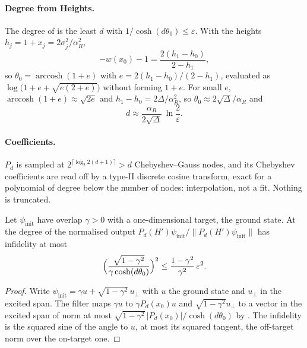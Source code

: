 \paragraph{Degree from Heights.} The degree of  is the least $d$ with $1/\cosh(d\theta_0)\le\varepsilon$. With the heights $h_j=1+x_j=2\sigma_j^2/\alpha_R^2$,
\begin{equation*}
    -w(x_0)-1=\frac{2(h_1-h_0)}{2-h_1},
\end{equation*}
so $\theta_0=\operatorname{arccosh}(1+e)$ with $e=2(h_1-h_0)/(2-h_1)$, evaluated as $\log\bigl(1+e+\sqrt{e(2+e)}\bigr)$ without forming $1+e$. For small $e$, $\operatorname{arccosh}(1+e)\approx\sqrt{2e}$ and $h_1-h_0=2\Delta/\alpha_R^2$, so $\theta_0\approx2\sqrt\Delta/\alpha_R$ and
\begin{equation}
    d\approx\frac{\alpha_R}{2\sqrt\Delta}\,\ln\frac2\varepsilon .
    \label{eq:app-minimax-growth}
\end{equation}

\paragraph{Coefficients.} $P_d$ is sampled at $2^{\lceil\log_2 2(d+1)\rceil}>d$ Chebyshev--Gauss nodes, and its Chebyshev coefficients are read off by a type-II discrete cosine transform, exact for a polynomial of degree below the number of nodes: interpolation, not a fit. Nothing is truncated.

\begin{proposition}[Guarantee]
\label{prop:minimax-guarantee}
Let $\psi_{\mathrm{init}}$ have overlap $\gamma>0$ with a one-dimensional target, the ground state. At the degree of  the normalised output $P_d(H')\psi_{\mathrm{init}}/\|P_d(H')\psi_{\mathrm{init}}\|$ has infidelity at most
\begin{equation*}
    \Bigl(\frac{\sqrt{1-\gamma^2}}{\gamma\cosh(d\theta_0)}\Bigr)^2\le\frac{1-\gamma^2}{\gamma^2}\,\varepsilon^2 .
\end{equation*}
\end{proposition}
\begin{proof}
Write $\psi_{\mathrm{init}}=\gamma u+\sqrt{1-\gamma^2}\,u_\perp$ with $u$ the ground state and $u_\perp$ in the excited span. The filter maps $\gamma u$ to $\gamma P_d(x_0)u$ and $\sqrt{1-\gamma^2}u_\perp$ to a vector in the excited span of norm at most $\sqrt{1-\gamma^2}\,|P_d(x_0)|/\cosh(d\theta_0)$ by . The infidelity is the squared sine of the angle to $u$, at most its squared tangent, the off-target norm over the on-target one.
\end{proof}

